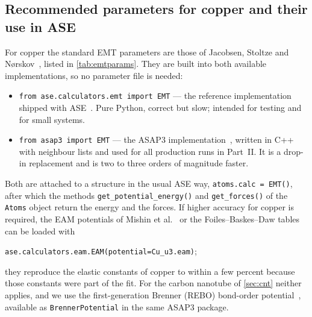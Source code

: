 \documentclass[11pt,a4paper]{article}
\numberwithin{equation}{section}
\theoremstyle{remark}
\begin{document}
\subsection{Recommended parameters for copper and their use in ASE}\label{sec:parameters}

For copper the standard EMT parameters are those of Jacobsen, Stoltze and
N{\o}rskov~\citep{jacobsen1996}, listed in \cref{tab:emtparams}. They are built into both available
implementations, so no parameter file is needed:
\begin{itemize}\setlength{\itemsep}{1pt}
  \item \texttt{from ase.calculators.emt import EMT} --- the reference implementation shipped with
    ASE~\citep{ase2017}. Pure Python, correct but slow; intended for testing and for small systems.
  \item \texttt{from asap3 import EMT} --- the ASAP3 implementation~\citep{asap}, written in C++ with
    neighbour lists and used for all production runs in Part~II. It is a drop-in replacement and is
    two to three orders of magnitude faster.
\end{itemize}
Both are attached to a structure in the usual ASE way, \texttt{atoms.calc = EMT()}, after which the
methods \texttt{get\_potential\_}\-\texttt{energy()} and \texttt{get\_forces()} of the
\texttt{Atoms} object return the energy and the forces. If higher
accuracy for copper is required, the EAM potentials of Mishin et al.~\citep{mishin2001} or the
Foiles--Baskes--Daw tables~\citep{foiles1986} can be loaded with
\begin{center}
  \texttt{ase.calculators.eam.EAM(potential=\textquotesingle Cu\_u3.eam\textquotesingle)};
\end{center}
they reproduce the elastic constants of copper to within a few percent because those constants were
part of the fit. For the carbon nanotube of \cref{sec:cnt} neither applies, and we use the
first-generation Brenner (REBO) bond-order potential~\citep{brenner1990}, available as
\texttt{BrennerPotential} in the same ASAP3 package.
\end{document}
